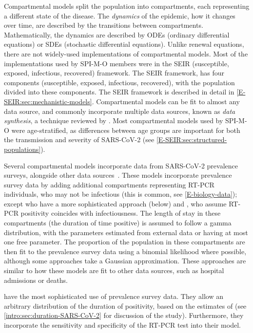 \documentclass[thesis.tex]{subfiles}
\begin{document}
Compartmental models split the population into compartments, each representing a different state of the disease.
The \emph{dynamics} of the epidemic, how it changes over time, are described by the transitions between compartments.
Mathematically, the dynamics are described by ODEs (ordinary differential equations) or SDEs (stochastic differential equations).
Unlike renewal equations, there are not widely-used implementations of compartmental models.
Most of the implementations used by SPI-M-O members were in the SEIR (susceptible, exposed, infectious, recovered) framework.
The SEIR framework, has four components (susceptible, exposed, infectious, recovered), with the population divided into these components.
The SEIR framework is described in detail in \cref{E-SEIR:sec:mechanistic-models}.
Compartmental models can be fit to almost any data source, and commonly incorporate multiple data sources, known as \emph{data synthesis}, a technique reviewed by \textcite{birrellEvidence}.
Most compartmental models used by SPI-M-O were age-stratified, as differences between age groups are important for both the transmission and severity of SARS-CoV-2 (see \cref{E-SEIR:sec:structured-populations}).

Several compartmental models incorporate data from SARS-CoV-2 prevalence surveys, alongside other data sources~\autocite{daviesAssociation,ironsEstimating,knockKey,nicholsonImproving,pooleyEstimation,birrellRTM2}.
These models incorporate prevalence survey data by adding additional compartments representing RT-PCR individuals, who may not be infectious (this is common, see \cref{E-biology-data}); except \textcite{nicholsonImproving} who have a more sophisticated approach (below) and \textcite{ironsEstimating}, who assume RT-PCR positivity coincides with infectiousness.
The length of stay in these compartments (the duration of time positive) is assumed to follow a gamma distribution, with the parameters estimated from external data or having at most one free parameter.
The proportion of the population in these compartments are then fit to the prevalence survey data using a binomial likelihood where possible, although some approaches take a Gaussian approximation.
These approaches are similar to how these models are fit to other data sources, such as hospital admissions or deaths.

\Textcite{nicholsonImproving} have the most sophisticated use of prevalence survey data.
They allow an arbitrary distribution of the duration of positivity, based on the estimates of \textcite{hellewellPCRSensitivity} (see \cref{intro:sec:duration-SARS-CoV-2} for discussion of the \textcite{hellewellPCRSensitivity} study).
Furthermore, they incorporate the sensitivity and specificity of the RT-PCR test into their model.
\end{document}

